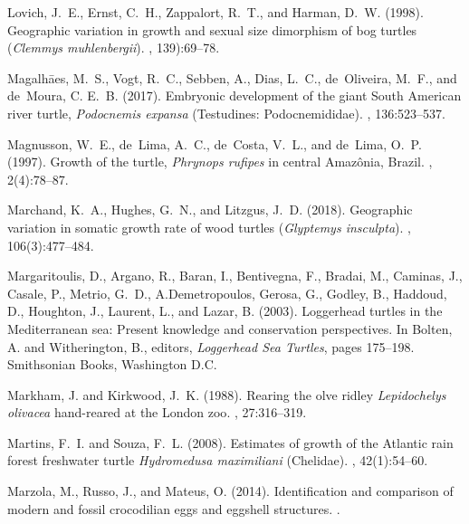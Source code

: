 \documentclass{article}
\begin{document}
\begin{thebibliography}{}
Lovich, J.~E., Ernst, C.~H., Zappalort, R.~T., and Harman, D.~W. (1998).
\newblock Geographic variation in growth and sexual size dimorphism of bog
  turtles (\emph{Clemmys muhlenbergii}).
, 139):69--78.

Magalh\={a}es, M.~S., Vogt, R.~C., Sebben, A., Dias, L.~C., de~Oliveira, M.~F.,
  and de~Moura, C. E.~B. (2017).
\newblock Embryonic development of the giant {S}outh {A}merican river turtle,
  \emph{Podocnemis expansa} ({T}estudines: {P}odocnemididae).
, 136:523--537.

Magnusson, W.~E., de~Lima, A.~C., de~Costa, V.~L., and de~Lima, O.~P. (1997).
\newblock Growth of the turtle, \emph{Phrynops rufipes} in central
  {A}maz\^{o}nia, {B}razil.
, 2(4):78--87.

Marchand, K.~A., Hughes, G.~N., and Litzgus, J.~D. (2018).
\newblock Geographic variation in somatic growth rate of wood turtles
  (\emph{Glyptemys insculpta}).
, 106(3):477--484.

Margaritoulis, D., Argano, R., Baran, I., Bentivegna, F., Bradai, M., Caminas,
  J., Casale, P., Metrio, G.~D., A.Demetropoulos, Gerosa, G., Godley, B.,
  Haddoud, D., Houghton, J., Laurent, L., and Lazar, B. (2003).
\newblock Loggerhead turtles in the {M}editerranean sea: Present knowledge and
  conservation perspectives.
\newblock In Bolten, A. and Witherington, B., editors, {\em Loggerhead Sea
  Turtles}, pages 175--198. Smithsonian Books, Washington D.C.

Markham, J. and Kirkwood, J.~K. (1988).
\newblock Rearing the olve ridley \emph{Lepidochelys olivacea} hand-reared at
  the {London zoo}.
, 27:316--319.

Martins, F.~I. and Souza, F.~L. (2008).
\newblock Estimates of growth of the {A}tlantic rain forest freshwater turtle
  \emph{Hydromedusa maximiliani} ({C}helidae).
, 42(1):54--60.

Marzola, M., Russo, J., and Mateus, O. (2014).
\newblock Identification and comparison of modern and fossil crocodilian eggs
  and eggshell structures.
.


\end{thebibliography}
\end{document}
